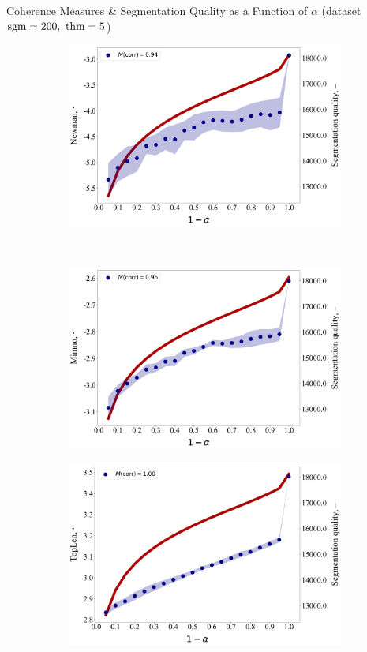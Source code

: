 \documentclass[russian]{beamer}
\begin{document}
\begin{frame}{Coherence Measures \& Segmentation Quality as a Function of $\alpha$ (dataset $\sgm=200,\ \thm=5$)}
  \begin{figure}[h]
    \begin{subfigure}[t]{0.48\textwidth}
      \includegraphics[width=\linewidth]{newman-iteration.jpg}
    \end{subfigure}
    ~
    \begin{subfigure}[t]{0.48\textwidth}
      \includegraphics[width=\linewidth]{mimno-iteration.jpg}
    \end{subfigure}
    \begin{subfigure}[t]{0.48\textwidth}
      \includegraphics[width=\linewidth]{toplen-iteration.jpg}

\end{subfigure}
\end{figure}
\end{frame}
\end{document}
